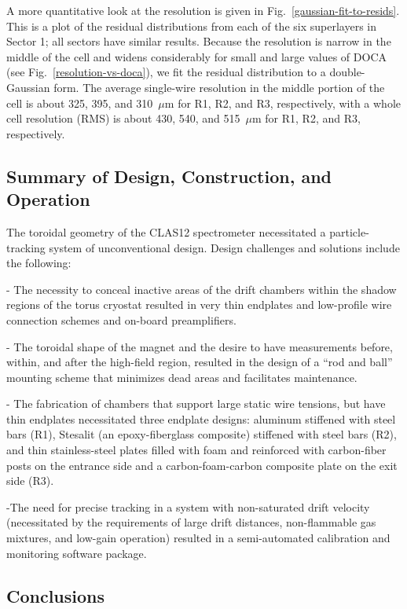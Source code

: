 A more quantitative look at the resolution is given in Fig.~\ref{gaussian-fit-to-resids}.
This is a plot of the residual distributions from each of the six superlayers in Sector 1; 
all sectors have similar results.
Because the resolution is narrow in the middle of the cell and widens considerably
for small and large values of DOCA (see Fig.~\ref{resolution-vs-doca}), we fit the
residual distribution to a double-Gaussian form. 
The average single-wire resolution in the middle 
portion of the cell is about 325, 395, and 310~$\mu$m for R1, R2, and R3, respectively,
with a whole cell resolution (RMS) is about 430, 540, and 515~$\mu$m for R1, R2, and R3, respectively.

\subsection{Summary of Design, Construction, and Operation}

The toroidal geometry of the CLAS12 spectrometer necessitated a particle-tracking 
system of unconventional design.  Design challenges and solutions include the following:

\noindent
- The necessity to conceal inactive areas of the drift chambers within the
shadow regions of the torus cryostat resulted in very thin endplates and low-profile
wire connection schemes and on-board preamplifiers.

\noindent
- The toroidal shape of the magnet and the desire to have measurements before, within, 
and after the high-field region, resulted in the design of a ``rod and ball'' mounting scheme
that minimizes dead areas and facilitates maintenance.

\noindent
- The fabrication of chambers that support large static wire tensions, but have thin 
endplates necessitated three endplate designs: aluminum stiffened with steel bars (R1),
Stesalit (an epoxy-fiberglass composite) stiffened with steel bars (R2), and thin stainless-steel 
plates filled with foam and reinforced
with carbon-fiber posts on the entrance side and a carbon-foam-carbon composite plate on the exit side (R3). 

\noindent
-The need for precise tracking in a system with non-saturated drift velocity 
(necessitated by the requirements of large drift distances, non-flammable gas mixtures, 
and low-gain operation) resulted in a semi-automated calibration and monitoring software 
package.

\subsection{Conclusions}

